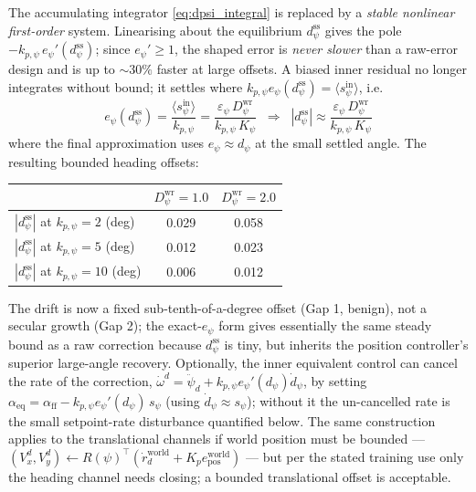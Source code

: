\documentclass[11pt]{article}
\theoremstyle{plain}
\theoremstyle{definition}
\newcommand{\Vx}{V_x}
\newcommand{\Vy}{V_y}
\newcommand{\Dwr}{D^{\mathrm{wr}}}
\begin{document}
The accumulating integrator \eqref{eq:dpsi_integral} is replaced by a \emph{stable
nonlinear first-order} system. Linearising about the equilibrium $d_\psi^{\mathrm{ss}}$
gives the pole $-k_{p,\psi}\,e_\psi'(d_\psi^{\mathrm{ss}})$; since $e_\psi'\ge1$, the
shaped error is \emph{never slower} than a raw-error design and is up to ${\sim}30\%$
faster at large offsets. A biased inner residual no longer integrates without bound; it
settles where $k_{p,\psi}e_\psi(d_\psi^{\mathrm{ss}})=\langle s_\psi^{\mathrm{in}}\rangle$,
i.e.
\begin{equation}
e_\psi(d_\psi^{\mathrm{ss}})=\frac{\langle s_\psi^{\mathrm{in}}\rangle}{k_{p,\psi}}
=\frac{\varepsilon_\psi\,\Dwr_\psi}{k_{p,\psi}\,K_\psi}
\;\;\Longrightarrow\;\;
|d_\psi^{\mathrm{ss}}|\approx\frac{\varepsilon_\psi\,\Dwr_\psi}{k_{p,\psi}\,K_\psi}
\label{eq:dpsi_bound}
\end{equation}
where the final approximation uses $e_\psi\approx d_\psi$ at the small settled angle. The
resulting bounded heading offsets:
\begin{center}
\begin{tabular}{lcc}
\toprule
& $\Dwr_\psi=1.0$ & $\Dwr_\psi=2.0$\\
\midrule
$|d_\psi^{\mathrm{ss}}|$ at $k_{p,\psi}=2$ (deg) & 0.029 & 0.058\\
$|d_\psi^{\mathrm{ss}}|$ at $k_{p,\psi}=5$ (deg) & 0.012 & 0.023\\
$|d_\psi^{\mathrm{ss}}|$ at $k_{p,\psi}=10$ (deg) & 0.006 & 0.012\\
\bottomrule
\end{tabular}
\end{center}
The drift is now a fixed sub-tenth-of-a-degree offset (Gap 1, benign), not a secular
growth (Gap 2); the exact-$e_\psi$ form gives essentially the same steady bound as a raw
correction because $d_\psi^{\mathrm{ss}}$ is tiny, but inherits the position
controller's superior large-angle recovery. Optionally, the inner equivalent control can
cancel the rate of the correction, $\dot\omega^d=\ddot\psi_d+k_{p,\psi}e_\psi'(d_\psi)
\dot d_\psi$, by setting $\alpha_{\mathrm{eq}}=\alpha_{\mathrm{ff}}-k_{p,\psi}
e_\psi'(d_\psi)\,s_\psi$ (using $\dot d_\psi\approx s_\psi$); without it the un-cancelled
rate is the small setpoint-rate disturbance quantified below. The same construction
applies to the translational channels if world position must be bounded ---
$(\Vx^d,\Vy^d)\leftarrow R(\psi)^\top(\dot r_d^{\mathrm{world}}+K_p
e_{\mathrm{pos}}^{\mathrm{world}})$ --- but per the stated training use only the heading
channel needs closing; a bounded translational offset is acceptable.
\end{document}
